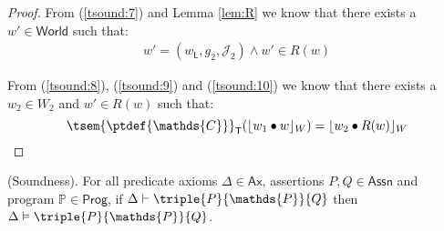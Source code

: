 \begin{thm}
{\begin{proof}
	From (\ref{tsound:7}) and Lemma \ref{lem:R} we know that there exists a $w' \in \mathsf{World}$ such that:
	\begin{gather}\label{tsound:10}
		w' = (w_\mathsf{L}, g_2, \mathcal{J}_2) \land w' \in R(w)
	\end{gather}
	
	From (\ref{tsound:8}), (\ref{tsound:9}) and (\ref{tsound:10}) we know that there exists a $w_2 \in W_2$ and $w' \in R(w)$ such that:
	\[
		\tsem{\ptdef{\mathds{C}}}_\mathsf{T}(\lfloor w_1 \bullet w \rfloor_W) = \lfloor w_2 \bullet R(w) \rfloor_W
	\]
	\end{proof}
	}
\end{thm}

\begin{thm}
	\label{thm:mcapSound}
	(Soundness).
	For all predicate axioms $\Delta \in \mathsf{Ax}$, assertions $P, Q \in \mathsf{Assn}$ and program $\mathds{P} \in \mathsf{Prog}$, if $\Delta \vdash \triple{P}{\mathds{P}}{Q}$ then $\Delta \vDash \triple{P}{\mathds{P}}{Q}$.
\end{thm}